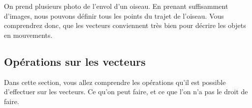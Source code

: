 \documentclass[
	11pt, %
	fleqn, %
	a4paper, %
]{LegrandOrangeBook}
\begin{document}


On prend plusieurs photo de l'envol d'un oiseau. En prenant suffisamment d'images, nous pouvons définir tous les points du trajet de l'oiseau. Vous comprendrez donc, que les vecteurs conviennent très bien pour décrire les objets en mouvements.


\subsection{Opérations sur les vecteurs}
Dans cette section, vous allez comprendre les opérations qu'il est possible d'effectuer sur les vecteurs. Ce qu'on peut faire, et ce que l'on n'a pas le droit de faire.
\end{document}
